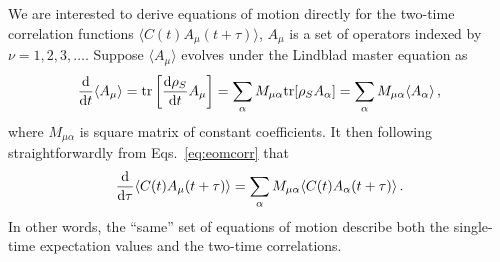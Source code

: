 \documentclass[aps,prd,10pt,twocolumn,superscriptaddress,floatfix,nofootinbib,amsmath,amssymb,altaffilletter,preprintnumbers]{revtex4-1}
\begin{document}
We are interested to derive equations of motion directly for the two-time correlation functions $\langle C(t) A_\mu(t+\tau) \rangle$, $A_\mu$ is a set of operators indexed by $\nu= 1,2,3, \ldots$.  Suppose $\langle A_\mu \rangle$ evolves under the Lindblad master equation as 
\begin{equation}
\frac{{\rm d}}{{\rm d} t} \langle A_\mu \rangle = {\rm tr} \left[\frac{{\rm d} \rho_S}{{\rm d} t} A_\mu \right] = \sum_\alpha M_{\mu \alpha} {\rm tr} [\rho_S A_\alpha]   = \sum_\alpha M_{\mu \alpha} \langle A_\alpha \rangle\, ,
\label{eq:corr1}
\end{equation}
where $M_{\mu \alpha}$ is square matrix of constant coefficients.  It then following straightforwardly from Eqs.~\eqref{eq:eomcorr} that
\begin{equation}
\frac{{\rm d}}{{\rm d} \tau} \langle C(t) A_\mu (t+\tau) \rangle = \sum_\alpha M_{\mu \alpha} \langle C(t) A_\alpha(t+\tau) \rangle\, .
\label{eq:corr2}
\end{equation}
In other words, the ``same'' set of equations of motion describe both the single-time expectation values and the two-time correlations.
\end{document}
